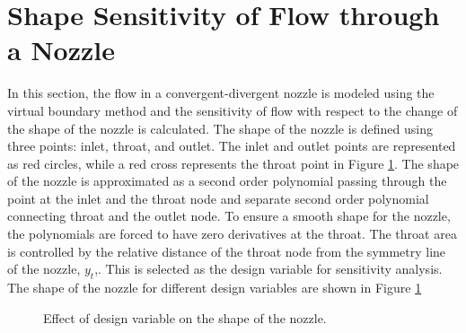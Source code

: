 \section{Shape Sensitivity of Flow through a Nozzle}
In this section, the flow in a convergent-divergent nozzle is modeled using the virtual boundary method and the sensitivity of flow with respect to the change of the shape of the nozzle is calculated.  The shape of the nozzle is defined using three points: inlet, throat, and outlet. The inlet and outlet points are represented as red circles, while a red cross represents the throat point in Figure \ref{fig:C4_nozzleShape}. The shape of the nozzle is approximated as a second order polynomial passing through the point at the inlet and the throat node and separate second order polynomial connecting throat and the outlet node. To ensure a smooth shape for the nozzle, the polynomials are forced to have zero derivatives at the throat. The throat area is controlled by the relative distance of the throat node from the symmetry line of the nozzle, $y_t$,. This is selected as the design variable for sensitivity analysis. The shape of the nozzle for different design variables are shown in Figure \ref{fig:C4_nozzleShape}

\begin{figure}[H]
    \centering
    \quad
    \caption{Effect of design variable on the shape of the nozzle.}
    \label{fig:C4_nozzleShape}
\end{figure}

